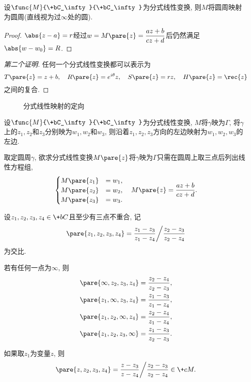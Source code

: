 \documentclass[../ComplexVariable.tex]{subfiles}
\begin{document}
\begin{theorem}
    设$\func{M}{\+bC_\infty}{\+bC_\infty}$为分式线性变换, 则$M$将圆周映射为圆周(直线视为过$\infty$处的圆).
\end{theorem}
\begin{proof}
    $\abs{z-a} = r$经过$\displaystyle w=M\pare{z} = \frac{az+b}{cz+d}$后仍然满足$\abs{w-w_0} = R$.
\end{proof}
\begin{proof}[第二个证明]
    任何一个分式线性变换都可以表示为
    \[ T\pare{z} = z+b,\quad R\pare{z} = e^{i\theta}z,\quad S\pare{z} = rz,\quad H\pare{z} = \rec{z} \]
    之间的复合.
\end{proof}
\begin{figure}[ht]
    \centering
    \caption{分式线性映射的定向}
\end{figure}
\begin{remark}
    设$\func{M}{\+bC_\infty}{\+bC_\infty}$为分式线性变换, $M$将$\gamma$映为$\Gamma$, 将$\gamma$上的$z_1,z_2$和$z_3$分别映为$w_1, w_2$和$w_3$, 则沿着$z_1, z_2, z_3$方向的左边映射为$w_1,w_2,w_3$的左边.
\end{remark}
取定圆周$\gamma$, 欲求分式线性变换$M\pare{z}$将$\gamma$映为$\Gamma$只需在圆周上取三点后列出线性方程组,
\[ \begin{cases}
    M\pare{z_1} &= w_1, \\
    M\pare{z_2} &= w_2, \\
    M\pare{z_3} &= w_3.
\end{cases}\quad M\pare{z} = \frac{az+b}{cz+d}. \]
\begin{definition}
    设$z_1,z_2,z_3,z_4\in \+bC$且至少有三点不重合, 记
    \[ \pare{z_1,z_2,z_3,z_4} = \frac{z_1-z_3}{z_1-z_4} \bigg/ \frac{z_2-z_3}{z_2-z_4} \]
    为交比.
\end{definition}
\begin{remark}
    若有任何一点为$\infty$, 则
    \begin{align*}
        \pare{\infty, z_2,z_3,z_4} &= \frac{z_2-z_4}{z_2-z_3}, \\
        \pare{z_1,\infty, z_3,z_4} &= \frac{z_1-z_3}{z_1-z_4}, \\
        \pare{z_1,z_2,\infty, z_4} &= \frac{z_2-z_4}{z_1-z_4}, \\
        \pare{z_1,z_2,z_3, \infty} &= \frac{z_1-z_3}{z_2-z_3}.
    \end{align*}
\end{remark}
如果取$z_1$为变量$z$, 则
\[ \pare{z, z_2, z_3, z_4} = \frac{z-z_3}{z-z_4}\bigg/ \frac{z_2-z_3}{z_2-z_4}\in \+cM. \]
\end{document}
